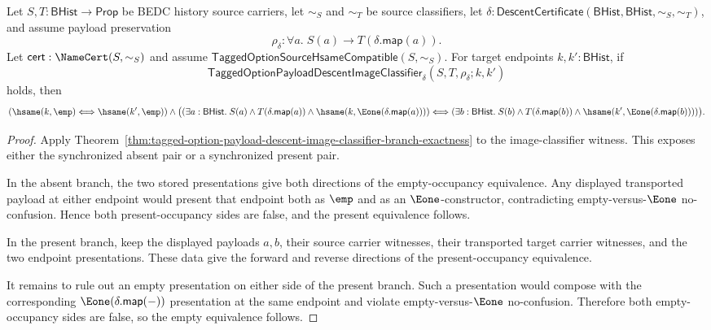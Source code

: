 \begin{theorem}
\label{thm:tagged-option-payload-descent-image-classifier-branch-occupancy-equivalence}
Let $S,T:\mathsf{BHist}\to\mathsf{Prop}$ be BEDC history source carriers, let
$\sim_S$ and $\sim_T$ be source classifiers, let
$\delta:\mathsf{DescentCertificate}(\mathsf{BHist},\mathsf{BHist},\sim_S,\sim_T)$,
and assume payload preservation
$$
\rho_{\delta}:\forall a.\;S(a)\to T(\delta.\mathsf{map}(a)).
$$
Let $\mathsf{cert}:\NameCert(S,\sim_S)$ and assume
$\mathsf{TaggedOptionSourceHsameCompatible}(S,\sim_S)$. For target endpoints
$k,k':\mathsf{BHist}$, if
$$
\mathsf{TaggedOptionPayloadDescentImageClassifier}_{\delta}
(S,T,\rho_{\delta};k,k')
$$
holds, then
$$
(\hsame(k,\emp)\Longleftrightarrow\hsame(k',\emp))
\land
\bigl((\exists a:\mathsf{BHist}.\;
S(a)\land T(\delta.\mathsf{map}(a))\land
\hsame(k,\Eone(\delta.\mathsf{map}(a))))\Longleftrightarrow
(\exists b:\mathsf{BHist}.\;
S(b)\land T(\delta.\mathsf{map}(b))\land
\hsame(k',\Eone(\delta.\mathsf{map}(b))))\bigr).
$$
\end{theorem}
\begin{proof}
Apply
Theorem~\ref{thm:tagged-option-payload-descent-image-classifier-branch-exactness}
to the image-classifier witness. This exposes either the synchronized absent
pair or a synchronized present pair.

In the absent branch, the two stored presentations give both directions of the
empty-occupancy equivalence. Any displayed transported payload at either
endpoint would present that endpoint both as $\emp$ and as an
$\Eone$-constructor, contradicting empty-versus-$\Eone$ no-confusion. Hence both
present-occupancy sides are false, and the present equivalence follows.

In the present branch, keep the displayed payloads $a,b$, their source carrier
witnesses, their transported target carrier witnesses, and the two endpoint
presentations. These data give the forward and reverse directions of the
present-occupancy equivalence.

It remains to rule out an empty presentation on either side of the present
branch. Such a presentation would compose with the corresponding
$\Eone(\delta.\mathsf{map}(-))$ presentation at the same endpoint and violate
empty-versus-$\Eone$ no-confusion. Therefore both empty-occupancy sides are
false, so the empty equivalence follows.
\end{proof}

